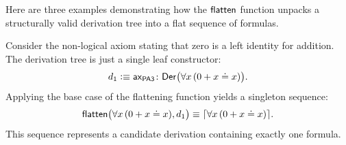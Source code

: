 \begin{xmpls}
    Here are three examples demonstrating how the $\mathsf{flatten}$ function unpacks a structurally valid derivation tree into a flat sequence of formulas.

    \begin{description}[font=\normalfont\scshape]
        \item[A Single Axiom.]
        Consider the non-logical axiom stating that zero is a left identity for addition. The derivation tree is just a single leaf constructor:
        \[
            d_1\defeq\fun{ax}_{\fun{PA3}}
                \colon\fun{Der}\bigl(
                    \forall x\,(0+x\doteq x)
                \bigr).
        \]
        Applying the base case of the flattening function yields a singleton sequence:
        \[
            \mathsf{flatten}\bigl(\forall x\,(0+x\doteq x), d_1\bigr)
                \equiv{\lceil\forall x\,(0+x\doteq x)\rceil}.
        \]
        This sequence represents a candidate derivation containing exactly one formula.
        

\end{description}
\end{xmpls}
